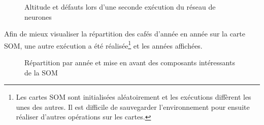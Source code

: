 \begin{figure}[H]
	\caption{\label{SecondSOMASNM}Altitude et défauts lors d'une seconde exécution du réseau de neurones}
	\centering
	\hfill
	\newline

	\centering
	\hfill
	\hfill
	\newline
	\centering 
\end{figure}


\noindent Afin de mieux visualiser la répartition des cafés d'année en année sur la carte SOM, une autre exécution a été réalisée\footnote{Les cartes SOM sont initialisées aléatoirement et les exécutions diffèrent les unes des autres. Il est difficile de sauvegarder l'environnement pour ensuite réaliser d'autres opérations sur les cartes.} et les années affichées. 


\begin{figure}[H]
	\caption{\label{ThirdSOMASNM}Répartition par année et mise en avant des composants intéressants de la SOM}
	\centering
	\hfill
	\newline
	
	\centering
	\hfill
	\hfill
	\newline
	\centering 
\end{figure}

\newpage
